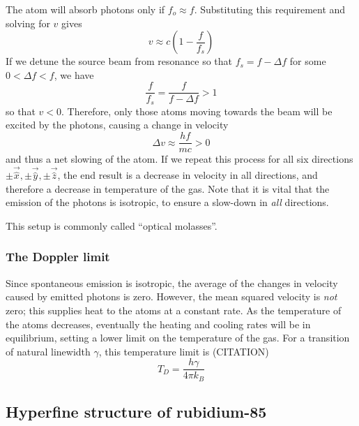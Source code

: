 \documentclass[11pt,twoside,a4paper]{article}
\begin{document}
The atom will absorb photons only if \(f_o\approx f\). Substituting this requirement and solving for \(v\) gives
\begin{equation}
    v\approx c\left(1-\frac{f}{f_s}\right)
\end{equation}
If we detune the source beam from resonance so that \(f_s=f-\Delta f\) for some \(0<\Delta f<f\), we have
\begin{equation}
    \frac{f}{f_s} = \frac{f}{f-\Delta f} > 1
\end{equation}
so that \(v<0\). Therefore, only those atoms moving towards the beam will be excited by the photons, causing a change in velocity
\begin{equation}
    \Delta v\approx\frac{hf}{mc}>0
\end{equation}
and thus a net slowing of the atom. If we repeat this process for all six directions \(\pm\vec{\hat{x}},\pm\vec{\hat{y}},\pm\vec{\hat{z}}\), the end result is a decrease in velocity in all directions, and therefore
a decrease in temperature of the gas. Note that it is vital that the emission of the photons is isotropic, to ensure a slow-down in \textit{all} directions.

This setup is commonly called ``optical molasses''.
\subsubsection{The Doppler limit}
Since spontaneous emission is isotropic, the average of the changes in velocity caused by emitted photons is zero. However, the mean squared velocity is \textit{not} zero; this supplies heat to the atoms at a constant rate.
As the temperature of the atoms decreases, eventually the heating and cooling rates will be in equilibrium, setting a lower limit on the temperature of the gas. For a transition of natural linewidth \(\gamma\), this temperature limit is (CITATION)
\[ T_D = \frac{h\gamma}{4\pi k_B} \]
\subsection{Hyperfine structure of rubidium-85}
\end{document}
